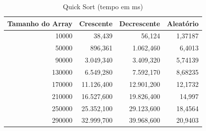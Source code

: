 \documentclass[a4paper, 12pt]{article}
\begin{document}
	\begin{longtable}[c]{@{}rrrr@{}}
		\caption{Quick Sort (tempo em ms)}
		\label{tab:quick1-table}\\
		\toprule
		\multicolumn{1}{l}{\textbf{Tamanho do Array}} & \multicolumn{1}{l}{\textbf{Crescente}} & \multicolumn{1}{l}{\textbf{Decrescente}} & \multicolumn{1}{l}{\textbf{Aleatório}} \\* \midrule
		\endfirsthead
		\endhead
		\multicolumn{1}{|r|}{10000}                   & \multicolumn{1}{r|}{38,439}                 & \multicolumn{1}{r|}{56,124}                 & \multicolumn{1}{r|}{1,37187}                \\* \midrule
		\multicolumn{1}{|r|}{50000}                   & \multicolumn{1}{r|}{896,361}                & \multicolumn{1}{r|}{1.062,460}              & \multicolumn{1}{r|}{6,4013}                 \\* \midrule
		\multicolumn{1}{|r|}{90000}                   & \multicolumn{1}{r|}{3.049,340}              & \multicolumn{1}{r|}{3.409,320}              & \multicolumn{1}{r|}{5,74139}                \\* \midrule
		\multicolumn{1}{|r|}{130000}                  & \multicolumn{1}{r|}{6.549,280}              & \multicolumn{1}{r|}{7.592,170}              & \multicolumn{1}{r|}{8,68235}                \\* \midrule
		\multicolumn{1}{|r|}{170000}                  & \multicolumn{1}{r|}{11.126,400}             & \multicolumn{1}{r|}{12.901,200}             & \multicolumn{1}{r|}{12,1732}                \\* \midrule
		\multicolumn{1}{|r|}{210000}                  & \multicolumn{1}{r|}{16.527,600}             & \multicolumn{1}{r|}{19.826,400}             & \multicolumn{1}{r|}{14,997}                 \\* \midrule
		\multicolumn{1}{|r|}{250000}                  & \multicolumn{1}{r|}{25.352,100}             & \multicolumn{1}{r|}{29.123,600}             & \multicolumn{1}{r|}{18,4564}                \\* \midrule
		\multicolumn{1}{|r|}{290000}                  & \multicolumn{1}{r|}{32.999,700}             & \multicolumn{1}{r|}{39.968,600}             & \multicolumn{1}{r|}{20,9403}                \\* \midrule

\end{longtable}
\end{document}
